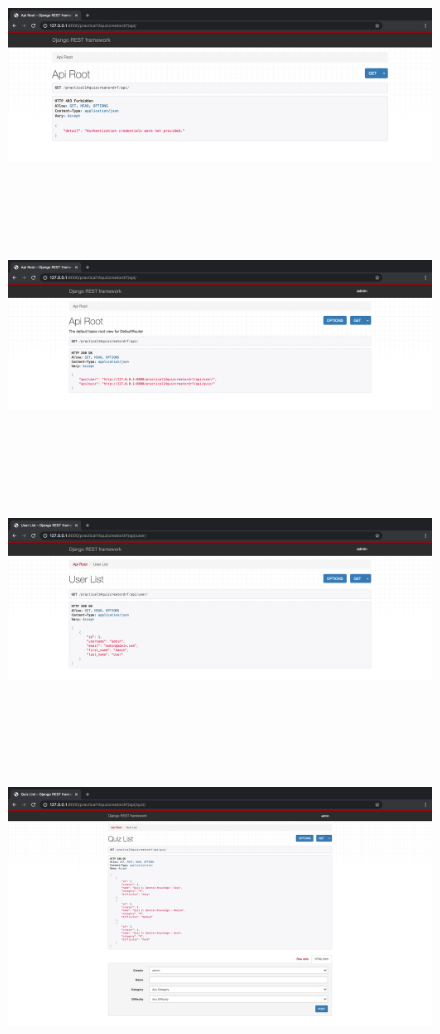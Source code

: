 \documentclass{article}
\begin{document}
\begin{figure}[H]
  \includegraphics[width=175mm, height=65mm]{./img/14-expected-drf-1.png}
  \includegraphics[width=175mm, height=65mm]{./img/14-expected-drf-2.png}
\end{figure}

\begin{figure}[H]
  \includegraphics[width=175mm, height=65mm]{./img/14-expected-drf-3.png}
  \includegraphics[width=175mm, height=95mm]{./img/14-expected-drf-4.png}
\end{figure}
\end{document}
